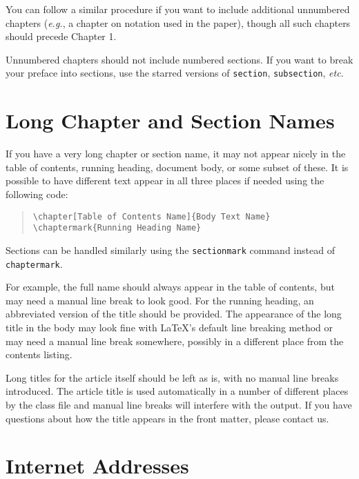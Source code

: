 \documentclass[examplefnt,biber]{nowfnt} %
\newcommand{\eg}{\emph{e.g.}}
\newcommand{\etc}{\emph{etc}}
\begin{document}
You can follow a similar procedure if you want to include additional
unnumbered chapters (\eg, a chapter on notation used in the paper),
though all such chapters should precede Chapter 1.

Unnumbered chapters should not include numbered sections. If you want
to break your preface into sections, use the starred versions of
\texttt{section}, \texttt{subsection}, \etc.


\section{Long Chapter and Section Names}

If you have a very long chapter or section name, it may not appear nicely
in the table of contents, running heading, document body, or some subset of these.
It is possible to have different text appear in all three places if needed
using the following code:
\begin{quote}
\begin{verbatim}
\chapter[Table of Contents Name]{Body Text Name}
\chaptermark{Running Heading Name}
\end{verbatim}
\end{quote}
Sections can be handled similarly using the \texttt{sectionmark} command
instead of \texttt{chaptermark}.

For example, the full name should always appear in the table of contents, but
may need a manual line break to look good. For the running heading,
an abbreviated version of the title should be provided. The appearance of the long
title in the body may look fine with \LaTeX's default line breaking method
or may need a manual line break somewhere, possibly in a different place from
the contents listing.

Long titles for the article itself should be left as is, with no manual line
breaks introduced. The article title is used automatically in a
number of different places by the class file and manual line breaks will
interfere with the output. If you have questions about how the title appears
in the front matter, please contact us.

\section{Internet Addresses}
\end{document}
